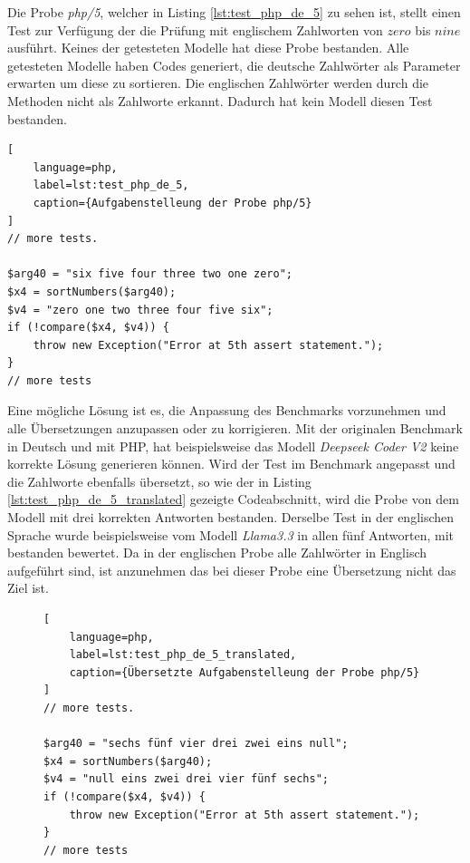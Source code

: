 Die Probe \textit{php/5}, welcher in Listing \ref{lst:test_php_de_5} zu sehen ist, stellt einen Test zur Verfügung der die Prüfung mit englischem Zahlworten von $zero$ bis $nine$ ausführt. Keines der getesteten Modelle hat diese Probe bestanden. Alle getesteten Modelle haben Codes generiert, die deutsche Zahlwörter als Parameter erwarten um diese zu sortieren. Die englischen Zahlwörter werden durch die Methoden nicht als Zahlworte erkannt. Dadurch hat kein Modell diesen Test bestanden.\vspace{0.2cm}

\begin{lstlisting}[
	language=php,
	label=lst:test_php_de_5,
	caption={Aufgabenstelleung der Probe php/5}
]
// more tests.

$arg40 = "six five four three two one zero";
$x4 = sortNumbers($arg40);
$v4 = "zero one two three four five six";
if (!compare($x4, $v4)) {
    throw new Exception("Error at 5th assert statement.");
}
// more tests
\end{lstlisting}

Eine mögliche Lösung ist es, die Anpassung des Benchmarks vorzunehmen und alle Übersetzungen anzupassen oder zu korrigieren. Mit der originalen Benchmark in Deutsch und mit PHP, hat beispielsweise das Modell \textit{Deepseek Coder V2} keine korrekte Lösung generieren können. Wird der Test im Benchmark angepasst und die Zahlworte ebenfalls übersetzt, so wie der in Listing \ref{lst:test_php_de_5_translated} gezeigte Codeabschnitt, wird die Probe von dem Modell mit drei korrekten Antworten bestanden. Derselbe Test in der englischen Sprache wurde beispielsweise vom Modell \textit{Llama3.3} in allen fünf Antworten, mit bestanden bewertet. Da in der englischen Probe alle Zahlwörter in Englisch aufgeführt sind, ist anzunehmen das bei dieser Probe eine Übersetzung nicht das Ziel ist.\vspace{0.2cm}

\begin{figure}[!ht]
\begin{lstlisting}[
	language=php,
	label=lst:test_php_de_5_translated,
	caption={Übersetzte Aufgabenstelleung der Probe php/5}
]
// more tests.

$arg40 = "sechs fünf vier drei zwei eins null";
$x4 = sortNumbers($arg40);
$v4 = "null eins zwei drei vier fünf sechs";
if (!compare($x4, $v4)) {
    throw new Exception("Error at 5th assert statement.");
}
// more tests
\end{lstlisting}
\end{figure}

